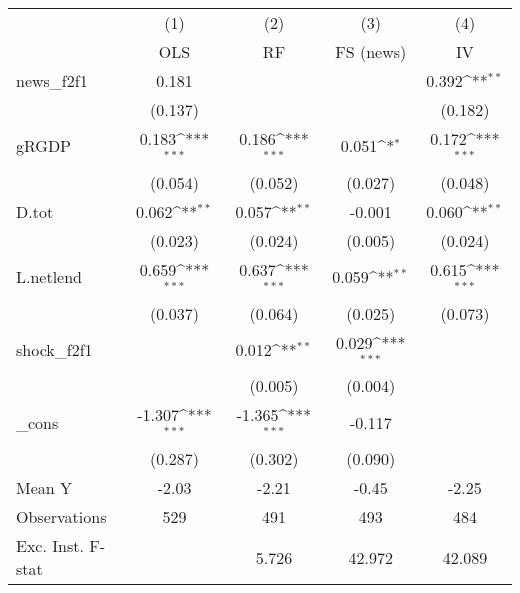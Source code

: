 {
\def\sym#1{\ifmmode^{#1}\else\(^{#1}\)\fi}
\begin{tabular}{l*{4}{c}}
\toprule
            &\multicolumn{1}{c}{(1)}&\multicolumn{1}{c}{(2)}&\multicolumn{1}{c}{(3)}&\multicolumn{1}{c}{(4)}\\
            &\multicolumn{1}{c}{OLS}&\multicolumn{1}{c}{RF}&\multicolumn{1}{c}{FS (news)}&\multicolumn{1}{c}{IV}\\
\midrule
news\_f2f1   &       0.181         &                     &                     &       0.392\sym{**} \\
            &     (0.137)         &                     &                     &     (0.182)         \\
\addlinespace
gRGDP       &       0.183\sym{***}&       0.186\sym{***}&       0.051\sym{*}  &       0.172\sym{***}\\
            &     (0.054)         &     (0.052)         &     (0.027)         &     (0.048)         \\
\addlinespace
D.tot       &       0.062\sym{**} &       0.057\sym{**} &      -0.001         &       0.060\sym{**} \\
            &     (0.023)         &     (0.024)         &     (0.005)         &     (0.024)         \\
\addlinespace
L.netlend   &       0.659\sym{***}&       0.637\sym{***}&       0.059\sym{**} &       0.615\sym{***}\\
            &     (0.037)         &     (0.064)         &     (0.025)         &     (0.073)         \\
\addlinespace
shock\_f2f1  &                     &       0.012\sym{**} &       0.029\sym{***}&                     \\
            &                     &     (0.005)         &     (0.004)         &                     \\
\addlinespace
\_cons      &      -1.307\sym{***}&      -1.365\sym{***}&      -0.117         &                     \\
            &     (0.287)         &     (0.302)         &     (0.090)         &                     \\
\midrule
Mean Y      &       -2.03         &       -2.21         &       -0.45         &       -2.25         \\
Observations&         529         &         491         &         493         &         484         \\
Exc. Inst. F-stat&                     &       5.726         &      42.972         &      42.089         \\
\bottomrule
\end{tabular}
}

